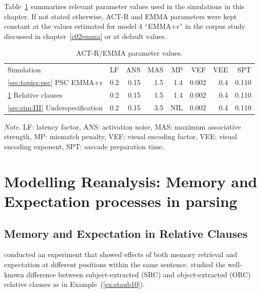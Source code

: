 \documentclass{cambridge7A}\usepackage[]{graphicx}\usepackage[]{color}
\begin{document}
Table~\ref{tab:params} summarizes relevant parameter values used in the simulations in this chapter. If not stated otherwise, ACT-R and EMMA parameters were kept constant at the values estimated for model $4$ ``EMMA+r'' in the corpus study discussed in chapter~\ref{c02emma} or at default values.


\begin{table}[!htbp]
\begin{center}
\begin{threeparttable}
  \begin{tabular}{lrrrrrrr}
  Simulation & LF & ANS & MAS & MP & VEF & VEE & SPT \\
  \ref{sec:topics:psc} PSC EMMA+r & 0.2 & 0.15 & 1.5 & 1.4 & 0.002 & 0.4 & 0.110 \\
  \ref{sec:sim:II} Relative clauses & 0.2 & 0.15 & 1.5 & 1.4 & 0.002 & 0.4 & 0.110 \\
  \ref{sec:sim:III} Underspecification & 0.2 & 0.15 & 3.5 & NIL & 0.002 & 0.4 & 0.110 \\
  \end{tabular}
  \begin{tablenotes}
    \item \emph{Note.} LF: latency factor, ANS: activation noise, MAS: maximum associative strength, MP: mismatch penalty, VEF: visual encoding factor, VEE: visual encoding exponent, SPT: saccade preparation time.
  \end{tablenotes}
\end{threeparttable}
\end{center}
  \caption{ACT-R/EMMA parameter values.}  \label{tab:params}
\end{table}

\section[Modelling Reanalysis]{Modelling Reanalysis: Memory and Expectation processes in parsing}\label{sec:sim:II}
\subsection{Memory and Expectation in Relative Clauses}

\cite{Staub2010a} conducted an experiment that showed effects of both memory retrieval and expectation at different positions within the same sentence. \cite{Staub2010a} studied the well-known difference between  subject-extracted (SRC) and  object-extracted (ORC) relative clauses as in Example~(\ref{ex:staub10}).
\end{document}
